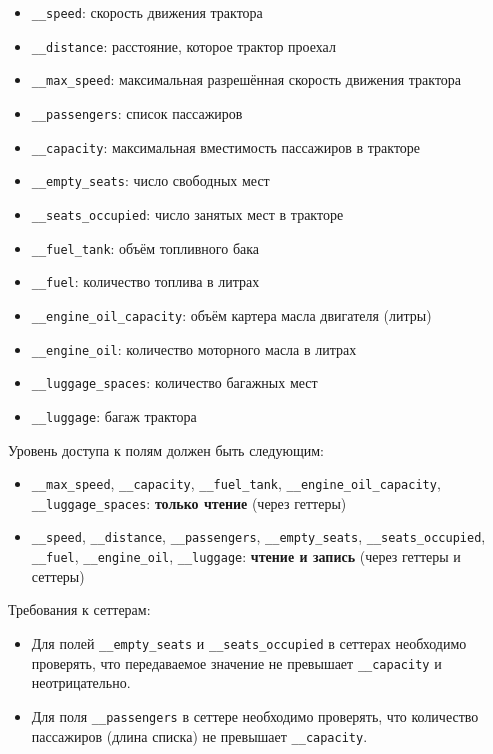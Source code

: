 \begin{enumerate}
\begin{itemize}
    \item \texttt{\_\_speed}: скорость движения трактора  
    \item \texttt{\_\_distance}: расстояние, которое трактор проехал  
    \item \texttt{\_\_max\_speed}: максимальная разрешённая скорость движения трактора  
    \item \texttt{\_\_passengers}: список пассажиров  
    \item \texttt{\_\_capacity}: максимальная вместимость пассажиров в тракторе  
    \item \texttt{\_\_empty\_seats}: число свободных мест  
    \item \texttt{\_\_seats\_occupied}: число занятых мест в тракторе  
    \item \texttt{\_\_fuel\_tank}: объём топливного бака  
    \item \texttt{\_\_fuel}: количество топлива в литрах  
    \item \texttt{\_\_engine\_oil\_capacity}: объём картера масла двигателя (литры)  
    \item \texttt{\_\_engine\_oil}: количество моторного масла в литрах  
    \item \texttt{\_\_luggage\_spaces}: количество багажных мест  
    \item \texttt{\_\_luggage}: багаж трактора  
\end{itemize}
Уровень доступа к полям должен быть следующим:
\begin{itemize}
    \item \texttt{\_\_max\_speed}, \texttt{\_\_capacity}, \texttt{\_\_fuel\_tank}, \texttt{\_\_engine\_oil\_capacity}, \texttt{\_\_luggage\_spaces}: \textbf{только чтение} (через геттеры)  
    \item \texttt{\_\_speed}, \texttt{\_\_distance}, \texttt{\_\_passengers}, \texttt{\_\_empty\_seats}, \texttt{\_\_seats\_occupied}, \texttt{\_\_fuel}, \texttt{\_\_engine\_oil}, \texttt{\_\_luggage}: \textbf{чтение и запись} (через геттеры и сеттеры)
\end{itemize}
Требования к сеттерам:
\begin{itemize}
    \item Для полей \texttt{\_\_empty\_seats} и \texttt{\_\_seats\_occupied} в сеттерах необходимо проверять, что передаваемое значение не превышает \texttt{\_\_capacity} и неотрицательно.  
    \item Для поля \texttt{\_\_passengers} в сеттере необходимо проверять, что количество пассажиров (длина списка) не превышает \texttt{\_\_capacity}.  

\end{itemize}
\end{enumerate}
